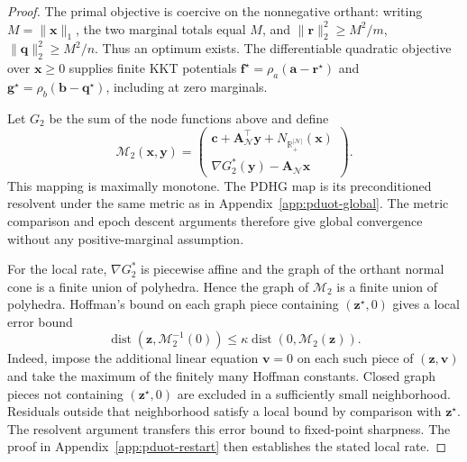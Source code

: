 \begin{proof}
The primal objective is coercive on the nonnegative orthant: writing $M=\|\mathbf x\|_1$, the two marginal totals equal $M$, and $\|\mathbf r\|_2^2\geq M^2/m$, $\|\mathbf q\|_2^2\geq M^2/n$.
Thus an optimum exists.
The differentiable quadratic objective over $\mathbf x\geq0$ supplies finite KKT potentials $\mathbf f^\star=\rho_a(\mathbf a-\mathbf r^\star)$ and $\mathbf g^\star=\rho_b(\mathbf b-\mathbf q^\star)$, including at zero marginals.

Let $G_2$ be the sum of the node functions above and define
\begin{equation*}
\mathcal M_2(\mathbf x,\mathbf y)=
\begin{pmatrix}
\mathbf c+\mathbf A_{\mathcal N}^{\top}\mathbf y+N_{\mathbb R_+^{|\mathcal N|}}(\mathbf x)\\
\nabla G_2^*(\mathbf y)-\mathbf A_{\mathcal N}\mathbf x
\end{pmatrix}.
\end{equation*}
This mapping is maximally monotone.
The PDHG map is its preconditioned resolvent under the same metric as in Appendix~\ref{app:pduot-global}.
The metric comparison and epoch descent arguments therefore give global convergence without any positive-marginal assumption.

For the local rate, $\nabla G_2^*$ is piecewise affine and the graph of the orthant normal cone is a finite union of polyhedra.
Hence the graph of $\mathcal M_2$ is a finite union of polyhedra.
Hoffman's bound on each graph piece containing $(\mathbf z^\star,0)$ gives a local error bound
\begin{equation*}
\operatorname{dist}(\mathbf z,\mathcal M_2^{-1}(0))\leq\kappa\operatorname{dist}(0,\mathcal M_2(\mathbf z)).
\end{equation*}
Indeed, impose the additional linear equation $\mathbf v=0$ on each such piece of $(\mathbf z,\mathbf v)$ and take the maximum of the finitely many Hoffman constants.
Closed graph pieces not containing $(\mathbf z^\star,0)$ are excluded in a sufficiently small neighborhood.
Residuals outside that neighborhood satisfy a local bound by comparison with $\mathbf z^\star$.
The resolvent argument transfers this error bound to fixed-point sharpness.
The proof in Appendix~\ref{app:pduot-restart} then establishes the stated local rate.
\end{proof}

